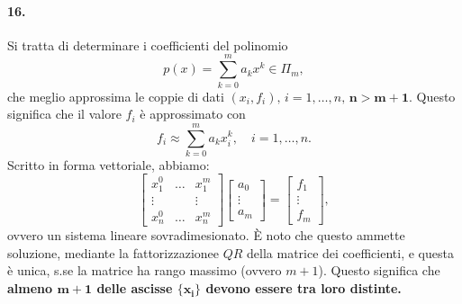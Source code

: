\paragraph{16.} Si tratta di determinare i coefficienti del polinomio
\begin{equation*}
    p(x)=\sum_{k=0}^m a_kx^k\in\Pi_m,
\end{equation*}
che meglio approssima le coppie di dati $(x_i,f_i),\, i=1,\hdots, n,\, \boldsymbol{n>m+1}$. Questo significa che il valore $f_i$ è approssimato con
\begin{equation*}
    f_i\approx\sum_{k=0}^ma_kx_i^k,\quad i=1,\hdots, n.
\end{equation*}
Scritto in forma vettoriale, abbiamo:
\begin{equation*}
    \begin{bmatrix}
        x_1^0&\hdots &x_1^m\\
        \vdots && \vdots\\
        x_n^0& \hdots &x_n^m
    \end{bmatrix}
    \begin{bmatrix}
        a_0\\
        \vdots\\
        a_m
    \end{bmatrix}=
    \begin{bmatrix}
        f_1\\
        \vdots\\
        f_m
    \end{bmatrix},
\end{equation*}
ovvero un sistema lineare sovradimesionato. È noto che questo ammette soluzione, mediante la fattorizzazionee $QR$ della matrice dei coefficienti, e questa è unica, s.se la matrice ha rango massimo (ovvero $m+1$). Questo significa che \textbf{almeno $\boldsymbol{m+1}$ delle ascisse $\boldsymbol{\{x_i\}}$ devono essere tra loro distinte.}


